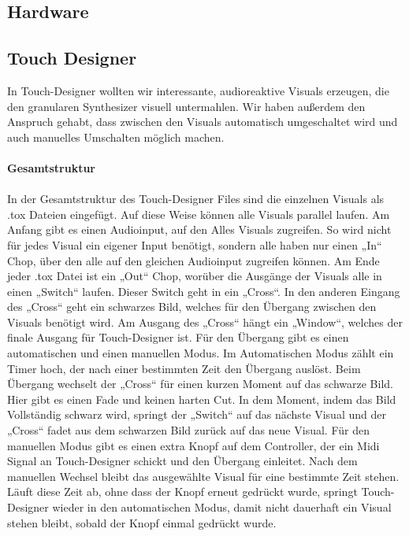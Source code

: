 \documentclass[12pt]{scrartcl}%
\theoremstyle{nonumberplain}
\begin{document}
\newpage


\subsection{Hardware}

\newpage

\subsection{Touch Designer}

In Touch-Designer wollten wir interessante, audioreaktive Visuals erzeugen, die den granularen Synthesizer visuell untermahlen. Wir haben außerdem den Anspruch gehabt, dass zwischen den Visuals automatisch umgeschaltet wird und auch manuelles Umschalten möglich machen.
\\\\
\textbf{Gesamtstruktur}
\\\\
In der Gesamtstruktur des Touch-Designer Files sind die einzelnen Visuals als .tox Dateien eingefügt. Auf diese Weise können alle Visuals parallel laufen. Am Anfang gibt es einen Audioinput, auf den Alles Visuals zugreifen. So wird nicht für jedes Visual ein eigener Input benötigt, sondern alle haben nur einen „In“ Chop, über den alle auf den gleichen Audioinput zugreifen können. Am Ende jeder .tox Datei ist ein „Out“ Chop, worüber die Ausgänge der Visuals alle in einen „Switch“ laufen. Dieser Switch geht in ein „Cross“. In den anderen Eingang des „Cross“ geht ein schwarzes Bild, welches für den Übergang zwischen den Visuals benötigt wird. Am Ausgang des „Cross“ hängt ein „Window“, welches der finale Ausgang für Touch-Designer ist. Für den Übergang gibt es einen automatischen und einen manuellen Modus. Im Automatischen Modus zählt ein Timer hoch, der nach einer bestimmten Zeit den Übergang auslöst. Beim Übergang wechselt der „Cross“ für einen kurzen Moment auf das schwarze Bild. Hier gibt es einen Fade und keinen harten Cut. In dem Moment, indem das Bild Vollständig schwarz wird, springt der „Switch“ auf das nächste Visual und der „Cross“ fadet aus dem schwarzen Bild zurück auf das neue Visual. Für den manuellen Modus gibt es einen extra Knopf auf dem Controller, der ein Midi Signal an Touch-Designer schickt und den Übergang einleitet. Nach dem manuellen Wechsel bleibt das ausgewählte Visual für eine bestimmte Zeit stehen. Läuft diese Zeit ab, ohne dass der Knopf erneut gedrückt wurde, springt Touch-Designer wieder in den automatischen Modus, damit nicht dauerhaft ein Visual stehen bleibt, sobald der Knopf einmal gedrückt wurde. 
\end{document}
